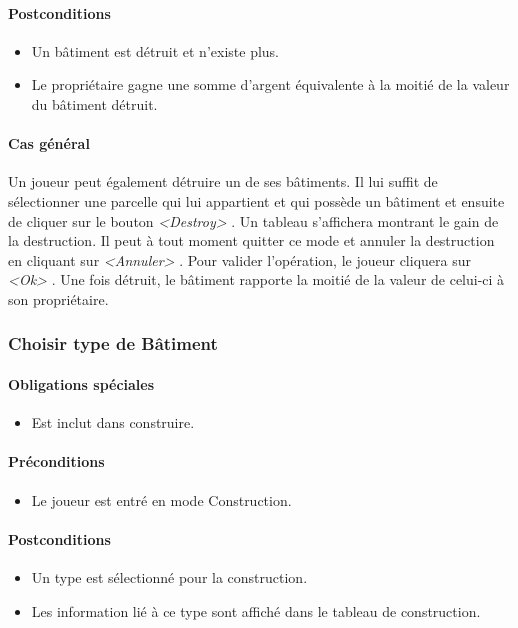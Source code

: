 \documentclass[a4paper,11pt]{report}
\begin{document}
\paragraph{Postconditions}
\begin{itemize}
 \item Un bâtiment est détruit et n’existe plus.
 \item Le propriétaire gagne une somme d'argent équivalente à la moitié de la valeur du bâtiment détruit.
\end{itemize}
\paragraph{Cas général}
Un joueur peut également détruire un de ses bâtiments. Il lui suffit de sélectionner une parcelle qui lui appartient et qui possède un bâtiment et ensuite de cliquer sur le bouton \og \textit{<Destroy>} \fg. Un tableau s'affichera montrant le gain de la destruction. Il peut à tout moment quitter ce mode et annuler la destruction en cliquant sur \og \textit{<Annuler>} \fg. Pour valider l'opération, le joueur cliquera sur \og \textit{<Ok>} \fg. Une fois détruit, le bâtiment rapporte la moitié de la valeur de celui-ci à son propriétaire.
\newpage
\subsubsection{Choisir type de Bâtiment}
\paragraph{Obligations spéciales}
\begin{itemize}
 \item Est inclut dans construire.
\end{itemize}
\paragraph{Préconditions}
\begin{itemize}
 \item Le joueur est entré en mode Construction.
\end{itemize}
\paragraph{Postconditions}
\begin{itemize}
 \item Un type est sélectionné pour la construction.
 \item Les information lié à ce type sont affiché dans le tableau de construction.
\end{itemize}
\end{document}
